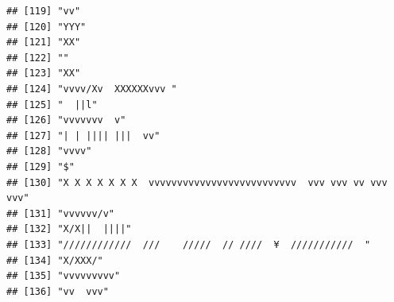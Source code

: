 \documentclass[
]{article}
\begin{document}
\begin{verbatim}
## [119] "vv"                                                                                                                                       
## [120] "YYY"                                                                                                                                      
## [121] "XX"                                                                                                                                       
## [122] ""                                                                                                                                         
## [123] "XX"                                                                                                                                       
## [124] "vvvv/Xv  XXXXXXvvv "                                                                                                                      
## [125] "  ||l"                                                                                                                                    
## [126] "vvvvvvv  v"                                                                                                                               
## [127] "| | |||| |||  vv"                                                                                                                         
## [128] "vvvv"                                                                                                                                     
## [129] "$"                                                                                                                                        
## [130] "X X X X X X X  vvvvvvvvvvvvvvvvvvvvvvvvvv  vvv vvv vv vvv vvv"                                                                            
## [131] "vvvvvv/v"                                                                                                                                 
## [132] "X/X||  ||||"                                                                                                                              
## [133] "////////////  ///    /////  // ////  ¥  ///////////  "                                                                                    
## [134] "X/XXX/"                                                                                                                                   
## [135] "vvvvvvvvv"                                                                                                                                
## [136] "vv  vvv"                                                                                                                                  

\end{verbatim}
\end{document}
